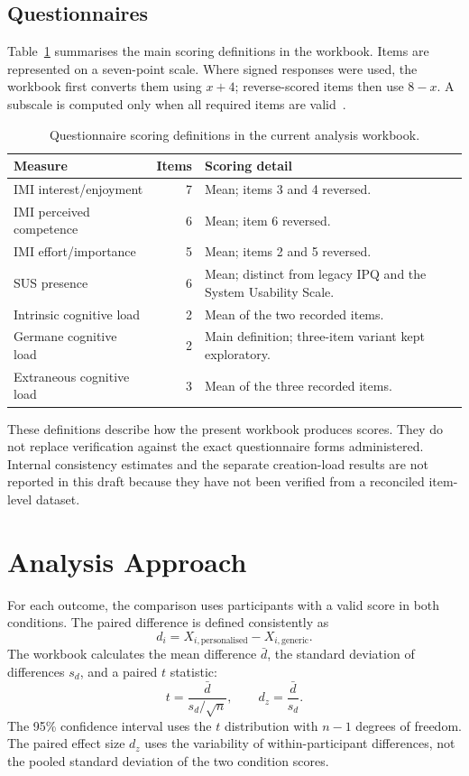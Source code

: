 \subsection{Questionnaires}
Table~\ref{tab:measures} summarises the main scoring definitions in the workbook. Items are represented on a seven-point scale. Where signed responses were used, the workbook first converts them using $x+4$; reverse-scored items then use $8-x$. A subscale is computed only when all required items are valid~\cite{srooranalysis}.

\begin{table}[htbp]
\centering
\small
\caption{Questionnaire scoring definitions in the current analysis workbook.}
\label{tab:measures}
\begin{tabularx}{\textwidth}{@{}p{5.3cm}rX@{}}
\toprule
Measure & Items & Scoring detail \\
\midrule
IMI interest/enjoyment & 7 & Mean; items 3 and 4 reversed. \\
IMI perceived competence & 6 & Mean; item 6 reversed. \\
IMI effort/importance & 5 & Mean; items 2 and 5 reversed. \\
SUS presence & 6 & Mean; distinct from legacy IPQ and the System Usability Scale. \\
Intrinsic cognitive load & 2 & Mean of the two recorded items. \\
Germane cognitive load & 2 & Main definition; three-item variant kept exploratory. \\
Extraneous cognitive load & 3 & Mean of the three recorded items. \\
\bottomrule
\end{tabularx}
\end{table}

These definitions describe how the present workbook produces scores. They do not replace verification against the exact questionnaire forms administered. Internal consistency estimates and the separate creation-load results are not reported in this draft because they have not been verified from a reconciled item-level dataset.

\section{Analysis Approach}
For each outcome, the comparison uses participants with a valid score in both conditions. The paired difference is defined consistently as
\begin{equation}
d_i=X_{i,\mathrm{personalised}}-X_{i,\mathrm{generic}}.
\end{equation}
The workbook calculates the mean difference $\bar d$, the standard deviation of differences $s_d$, and a paired $t$ statistic:
\begin{equation}
t=\frac{\bar d}{s_d/\sqrt{n}},\qquad d_z=\frac{\bar d}{s_d}.
\end{equation}
The 95\% confidence interval uses the $t$ distribution with $n-1$ degrees of freedom. The paired effect size $d_z$ uses the variability of within-participant differences, not the pooled standard deviation of the two condition scores.

